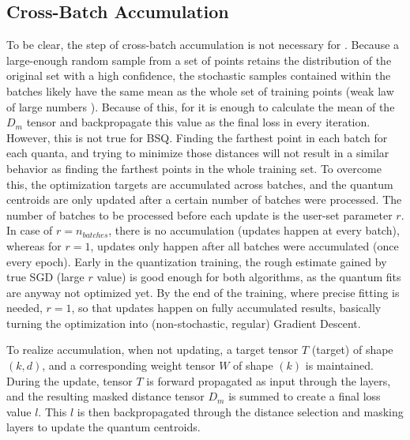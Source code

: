 		\subsection{Cross-Batch Accumulation}
			
			To be clear, the step of cross-batch accumulation is not necessary for \kmeans{}.
			Because a large-enough random sample from a set of points retains the distribution of the original set with a high confidence, the stochastic samples contained within the batches likely have the same mean as the whole set of training points (weak law of large numbers \cite{lawOfLarge}).
			Because of this, for \kmeans{} it is enough to calculate the mean of the $D_m$ tensor and backpropagate this value as the final loss in every iteration.			
			However, this is not true for \ac{BSQ}.
			Finding the farthest point in each batch for each quanta, and trying to minimize those distances will not result in a similar behavior as finding the farthest points in the whole training set.
			To overcome this, the optimization targets are accumulated across batches, and the quantum centroids are only updated after a certain number of batches were processed.
			The number of batches to be processed before each update is the user-set parameter $r$.
			In case of $r = n_{batches}$, there is no accumulation (updates happen at every batch), whereas for $r = 1$, updates only happen after all batches were accumulated (once every epoch).
			Early in the quantization training, the rough estimate gained by true \ac{SGD} (large $r$ value) is good enough for both algorithms, as the quantum fits are anyway not optimized yet.
			By the end of the training, where precise fitting is needed, $r=1$, so that updates happen on fully accumulated results, basically turning the optimization into (non-stochastic, regular) Gradient Descent.
			
			To realize accumulation, when not updating, a target tensor $T$ (target) of shape $(k, d)$, and a corresponding weight tensor $W$ of shape $(k)$ is maintained.
			During the update, tensor $T$ is forward propagated as input through the layers, and the resulting masked distance tensor $D_m$ is summed to create a final loss value $l$.
			This $l$ is then backpropagated through the distance selection and masking layers to update the quantum centroids.
			

